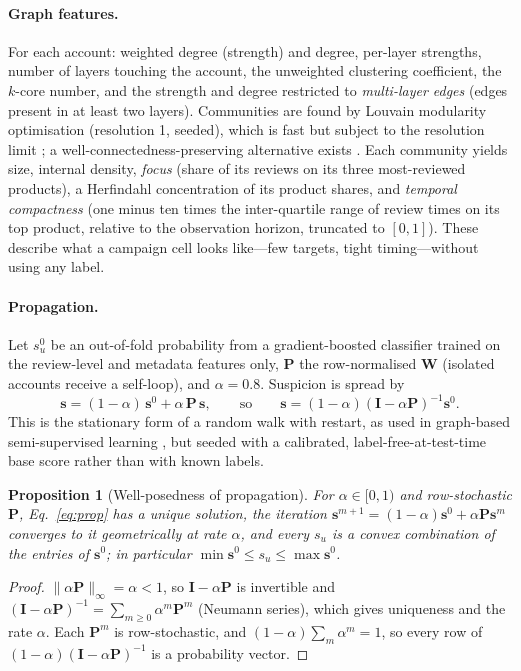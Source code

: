 \documentclass[pdflatex,sn-basic]{sn-jnl}
\theoremstyle{thmstyleone}
\newtheorem{proposition}{Proposition}
\theoremstyle{thmstylethree}
\begin{document}
\paragraph{Graph features.} For each account: weighted degree (strength) and degree, per-layer strengths, number of layers touching the account, the unweighted clustering coefficient, the $k$-core number, and the strength and degree restricted to \emph{multi-layer edges} (edges present in at least two layers). Communities are found by Louvain modularity optimisation \citep{blondel2008} (resolution 1, seeded), which is fast but subject to the resolution limit \citep{fortunato2007}; a well-connectedness-preserving alternative exists \citep{traag2019}. Each community yields size, internal density, \emph{focus} (share of its reviews on its three most-reviewed products), a Herfindahl concentration of its product shares, and \emph{temporal compactness} (one minus ten times the inter-quartile range of review times on its top product, relative to the observation horizon, truncated to $[0,1]$). These describe what a campaign cell looks like---few targets, tight timing---without using any label.

\paragraph{Propagation.} Let $s^0_u$ be an out-of-fold probability from a gradient-boosted classifier trained on the review-level and metadata features only, $\mathbf P$ the row-normalised $\mathbf W$ (isolated accounts receive a self-loop), and $\alpha=0.8$. Suspicion is spread by
\begin{equation}\label{eq:prop}
\mathbf s=(1-\alpha)\,\mathbf s^0+\alpha\,\mathbf P\,\mathbf s,\qquad\text{so}\qquad \mathbf s=(1-\alpha)(\mathbf I-\alpha\mathbf P)^{-1}\mathbf s^0 .
\end{equation}
This is the stationary form of a random walk with restart, as used in graph-based semi-supervised learning \citep{zhou2004}, but seeded with a calibrated, label-free-at-test-time base score rather than with known labels.

\begin{proposition}[Well-posedness of propagation]\label{prop:prop}
For $\alpha\in[0,1)$ and row-stochastic $\mathbf P$, Eq.~\eqref{eq:prop} has a unique solution, the iteration $\mathbf s^{m+1}=(1-\alpha)\mathbf s^0+\alpha\mathbf P\mathbf s^{m}$ converges to it geometrically at rate $\alpha$, and every $s_u$ is a convex combination of the entries of $\mathbf s^0$; in particular $\min\mathbf s^0\le s_u\le\max\mathbf s^0$.
\end{proposition}
\begin{proof}
$\|\alpha\mathbf P\|_\infty=\alpha<1$, so $\mathbf I-\alpha\mathbf P$ is invertible and $(\mathbf I-\alpha\mathbf P)^{-1}=\sum_{m\ge0}\alpha^m\mathbf P^m$ (Neumann series), which gives uniqueness and the rate $\alpha$. Each $\mathbf P^m$ is row-stochastic, and $(1-\alpha)\sum_m\alpha^m=1$, so every row of $(1-\alpha)(\mathbf I-\alpha\mathbf P)^{-1}$ is a probability vector.
\end{proof}
\end{document}
